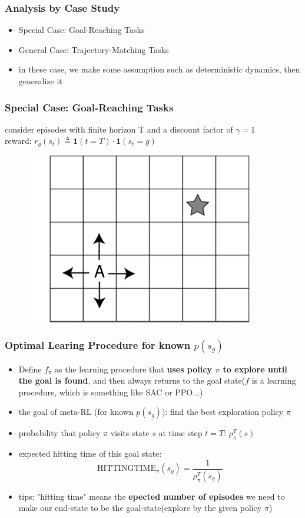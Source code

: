 \documentclass[aspectratio=169]{beamer}
\begin{document}
\begin{frame}
  \frametitle{Analysis by Case Study}
  \begin{itemize}
    \item Special Case: Goal-Reaching Tasks
    \item General Case: Trajectory-Matching Tasks
    \item in these case, we make some assumption such as deterministic dynamics, then generalize it
  \end{itemize}
  

\end{frame}

\begin{frame}
  \frametitle{Special Case: Goal-Reaching Tasks}

  consider episodes with finite horizon T and a discount factor of $\gamma = 1$\\
  reward: $r_{g}\left(s_{t}\right) \triangleq \mathbf{1}(t=T) \cdot \mathbf{1}\left(s_{t}=g\right)$
  \begin{figure}
    \centering
    \includegraphics[width=0.4\linewidth]{imgs/Grid-world-problem-The-agent-moves-in-four-directions-to-find-the-goal-marked-with-a.png}
    \end{figure}
\end{frame}

\begin{frame}
  \frametitle{Optimal Learing Procedure for known $p(s_g)$}
  \begin{itemize}
    \item Define $f_\pi$ as the learning procedure that \textbf{uses policy $\pi$ to explore until the goal is found}, and then always returns to the goal state($f$ is a learning procedure, which is something like SAC or PPO...)
    \item the goal of meta-RL (for known $p(s_g)$): find the best exploration policy $\pi$
    \item probability that policy $\pi$ visits state $s$ at time step $t = T$: $\rho_{\pi}^{T}(s)$
    \item expected hitting time of this goal state: \\
    $$\mathrm{HITTINGTIME}_{\pi}\left(s_{g}\right)=\frac{1}{\rho_{\pi}^{T}\left(s_{g}\right)}$$
    \item tips: "hitting time" means the \textbf{epected number of episodes} we need to make our end-state to be the goal-state(explore by the given policy $\pi$)
    \end{itemize}
\end{frame}
\end{document}
